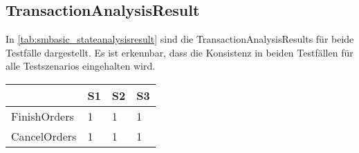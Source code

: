 \subsection{TransactionAnalysisResult}
In \cref{tab:smbasic_stateanalysisresult} sind die TransactionAnalysisResults für beide Testfälle dargestellt. Es ist erkennbar, dass die Konsistenz in beiden Testfällen für alle Testszenarios eingehalten wird. 

\begin{center}
	\fontsize{9}{12}\selectfont
	\begin{longtable}[h]{|p{2cm}|p{1cm}|p{1cm}|p{1cm}|}
		\hline
		 & S1 & S2 & S3 \\ \hline
		\endhead
		\endfoot
		FinishOrders & 1 & 1 & 1 \\ \hline	
		CancelOrders & 1 & 1 & 1 \\ \hline
	\end{longtable}
\end{center}
\FloatBarrier